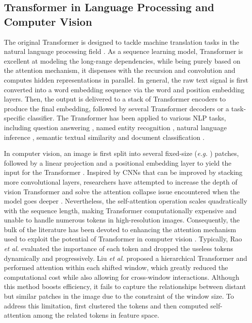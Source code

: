 \documentclass[lettersize,journal]{IEEEtran}
\begin{document}
\subsection{Transformer in Language Processing and Computer Vision}
The original Transformer is designed to tackle machine translation tasks in the natural language processing field \cite{Transformer}. As a sequence learning model, Transformer is excellent at modeling the long-range dependencies, while being purely based on the attention mechanism, it dispenses with the recursion and convolution and computes hidden representations in parallel. In general, the raw text signal is first converted into a word embedding sequence via the word and position embedding layers. Then, the output is delivered to a stack of Transformer encoders to produce the final embedding, followed by several Transformer decoders or a task-specific classifier. The Transformer has been applied to various NLP tasks, including question answering \cite{TASLP_QA}, named entity recognition \cite{nlp_use_trans_ner3}, natural language inference \cite{nlp_use_trans_nli1}, semantic textual similarity \cite{TASLP_sentence_embedding} and document classification \cite{nlp_use_trans_dc3}. 

In computer vision, an image is first split into several fixed-size (\textit{e.g.} ) patches, followed by a linear projection and a positional embedding layer to yield the input for the Transformer \cite{ViT}. Inspired by CNNs that can be improved by stacking more convolutional layers, researchers have attempted to increase the depth of vision Transformer and solve the attention collapse issue encountered when the model goes deeper \cite{deepvit}. Nevertheless, the self-attention operation scales quadratically with the sequence length, making Transformer computationally expensive and unable to handle numerous tokens in high-resolution images. Consequently, the bulk of the literature has been devoted to enhancing the attention mechanism used to exploit the potential of Transformer in computer vision \cite{Swin, cluster_vit, cluster_CVPR, ViT2, drop_vit}. Typically, Rao \textit{et al.} \cite{drop_vit} evaluated the importance of each token and dropped the useless tokens dynamically and progressively. Liu\textit{ et al.} \cite{Swin} proposed a hierarchical Transformer and performed attention within each shifted window, which greatly reduced the computational cost while also allowing for cross-window interactions. Although this method boosts efficiency, it fails to capture the relationships between distant but similar patches in the image due to the constraint of the window size. To address this limitation, \cite{cluster_vit} first clustered the tokens and then computed self-attention among the related tokens in feature space. 
\end{document}
